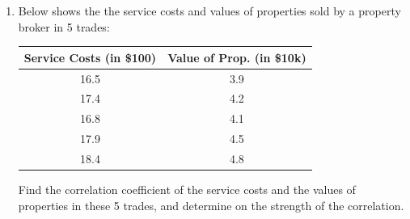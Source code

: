 \documentclass{report}
\begin{document}
\begin{multicols}{2}
\begin{enumerate}
    \item Below shows the the service costs and values of properties sold by a property
          broker in 5 trades:
          \begin{center}
            \begin{tabular}{|c|c|}
              \hline
              Service Costs (in \$100) & Value of Prop. (in \$10k) \\
              \hline
              16.5                     & 3.9                       \\
              17.4                     & 4.2                       \\
              16.8                     & 4.1                       \\
              17.9                     & 4.5                       \\
              18.4                     & 4.8                       \\
              \hline
            \end{tabular}
          \end{center}
          Find the correlation coefficient of the service costs and the values of properties in these 5 trades, and determine on the strength of the correlation.
          \sol{}
          \begin{center}
\end{center}
\end{enumerate}
\end{multicols}
\end{document}
